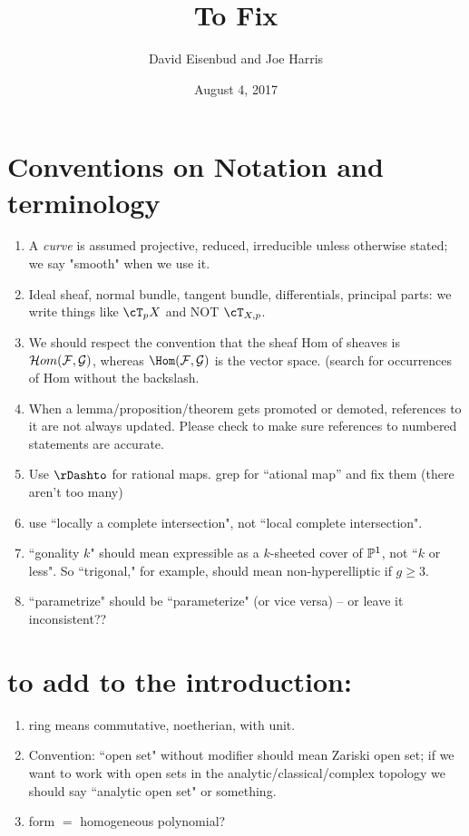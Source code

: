 \documentclass[12pt, leqno]{book}
\date{August 4, 2017}
\title{To Fix}
\author{David Eisenbud and Joe Harris }
\begin{document}
\maketitle

\setlength{\parskip}{5pt}

 
 \section{Conventions on Notation and terminology}
\begin{enumerate}

\item A \emph{curve} is assumed projective, reduced, irreducible unless otherwise stated; we say "smooth" when we use it.

\item Ideal sheaf, normal bundle, tangent bundle, differentials, principal parts: we write things like 
$\cT_{p}X$ and NOT $\cT_{X,p}$.  

\item We should respect the convention that the sheaf Hom of sheaves is
$\cH om(\cF,\cG)$, whereas $\Hom(\cF,\cG)$ is the vector space. (search for occurrences of Hom without the backslash.

\item When a lemma/proposition/theorem gets promoted or demoted, references to it are not always updated. Please check to make sure references to numbered statements are accurate. 

\item Use $\rDashto$ for rational maps. grep for ``ational map'' and fix them (there aren't too many) 

\item use ``locally a complete intersection", not  ``local complete intersection".

\item ``gonality $k$" should mean expressible as a $k$-sheeted cover of $\PP^1$, not ``$k$ or less". So ``trigonal," for example, should mean non-hyperelliptic if $g \geq 3$.

\item ``parametrize" should be ``parameterize" (or vice versa) -- or leave it inconsistent??

\end{enumerate}


\section {to add to the introduction:}
\begin{enumerate}
\item ring means commutative, noetherian, with unit.
\item Convention: ``open set" without modifier should mean Zariski open set; if we want to work with open sets in the analytic/classical/complex topology we should say ``analytic open set" or something.

 \item form $=$ homogeneous polynomial?
 

 \end{enumerate}
 
\end{document}
